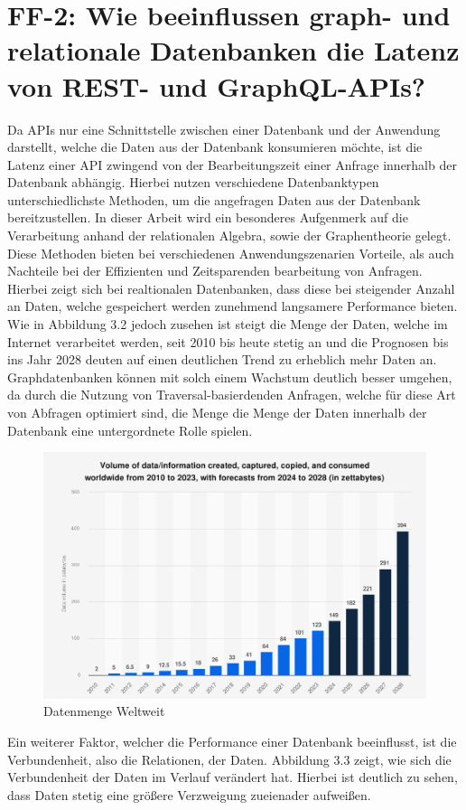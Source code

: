 \section{FF-2: Wie beeinflussen graph- und relationale Datenbanken die Latenz von REST- und GraphQL-APIs?} %
\label{sec:ff2}
Da APIs nur eine Schnittstelle zwischen einer Datenbank und der Anwendung darstellt, welche die Daten aus der Datenbank konsumieren möchte, ist die Latenz einer API zwingend von der Bearbeitungszeit einer Anfrage innerhalb der Datenbank abhängig. Hierbei nutzen verschiedene Datenbanktypen unterschiedlichste Methoden, um die angefragen Daten aus der Datenbank bereitzustellen. In dieser Arbeit wird ein besonderes Aufgenmerk auf die Verarbeitung anhand der relationalen Algebra, sowie der Graphentheorie gelegt. Diese Methoden bieten bei verschiedenen Anwendungszenarien Vorteile, als auch Nachteile bei der Effizienten und Zeitsparenden bearbeitung von Anfragen. Hierbei zeigt sich bei realtionalen Datenbanken, dass diese bei steigender Anzahl an Daten, welche gespeichert werden zunehmend langsamere Performance bieten.
Wie in Abbildung 3.2 jedoch zusehen ist steigt die Menge der Daten, welche im Internet verarbeitet werden, seit 2010 bis heute stetig an und die Prognosen bis ins Jahr 2028 deuten auf einen deutlichen Trend zu erheblich mehr Daten an. Graphdatenbanken können mit solch einem Wachstum deutlich besser umgehen, da durch die Nutzung von Traversal-basierdenden Anfragen, welche für diese  Art von Abfragen optimiert sind, die Menge die Menge der Daten innerhalb der Datenbank eine untergordnete Rolle spielen. \citep{9677042} \citep{performancenosql}
\begin{figure}[H]
	\centering
	\includegraphics[scale=.4]{Illustrations/growthofdata.png}
	\caption{Datenmenge Weltweit \citep{statista}}
\end{figure}
\noindent
Ein weiterer Faktor, welcher die Performance einer Datenbank beeinflusst, ist die Verbundenheit, also die Relationen, der Daten. Abbildung 3.3 zeigt, wie sich die Verbundenheit der Daten im Verlauf verändert hat. Hierbei ist deutlich zu sehen, dass Daten stetig eine größere Verzweigung zueienader aufweißen. 

